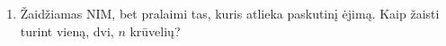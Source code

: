 \begin{enumerate}
  \item {} Žaidžiamas NIM, bet pralaimi tas, kuris atlieka
    paskutinį ėjimą. Kaip žaisti turint vieną, dvi, $n$ krūvelių?
\end{enumerate}

